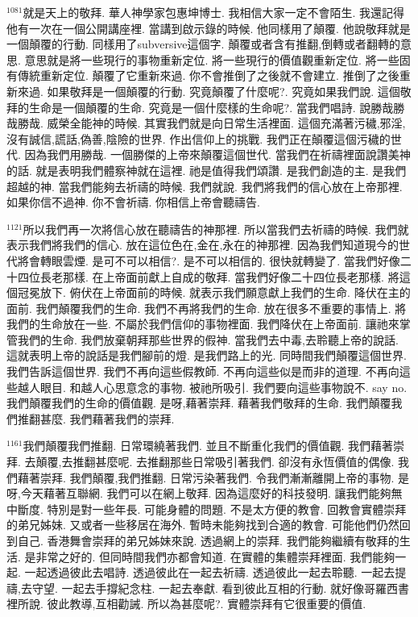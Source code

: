 \documentclass{book}
\begin{document}
$^{1081}$就是天上的敬拜.
華人神學家包惠坤博士.
我相信大家一定不會陌生.
我還記得他有一次在一個公開講座裡.
當講到啟示錄的時候.
他同樣用了顛覆.
他說敬拜就是一個顛覆的行動.
同樣用了subversive這個字.
顛覆或者含有推翻,倒轉或者翻轉的意思.
意思就是將一些現行的事物重新定位.
將一些現行的價值觀重新定位.
將一些固有傳統重新定位.
顛覆了它重新來過.
你不會推倒了之後就不會建立.
推倒了之後重新來過.
如果敬拜是一個顛覆的行動.
究竟顛覆了什麼呢?.
究竟如果我們說.
這個敬拜的生命是一個顛覆的生命.
究竟是一個什麼樣的生命呢?.
當我們唱詩.
說勝哉勝哉勝哉.
威榮全能神的時候.
其實我們就是向日常生活裡面.
這個充滿著污穢,邪淫,沒有誠信,謊話,偽善,陰險的世界.
作出信仰上的挑戰.
我們正在顛覆這個污穢的世代.
因為我們用勝哉.
一個勝傑的上帝來顛覆這個世代.
當我們在祈禱裡面說讚美神的話.
就是表明我們體察神就在這裡.
祂是值得我們頌讚.
是我們創造的主.
是我們超越的神.
當我們能夠去祈禱的時候.
我們就說.
我們將我們的信心放在上帝那裡.
如果你信不過神.
你不會祈禱.
你相信上帝會聽禱告.

$^{1121}$所以我們再一次將信心放在聽禱告的神那裡.
所以當我們去祈禱的時候.
我們就表示我們將我們的信心.
放在這位色在,金在,永在的神那裡.
因為我們知道現今的世代將會轉眼雲煙.
是可不可以相信?.
是不可以相信的.
很快就轉變了.
當我們好像二十四位長老那樣.
在上帝面前獻上自成的敬拜.
當我們好像二十四位長老那樣.
將這個冠冕放下.
俯伏在上帝面前的時候.
就表示我們願意獻上我們的生命.
降伏在主的面前.
我們顛覆我們的生命.
我們不再將我們的生命.
放在很多不重要的事情上.
將我們的生命放在一些.
不屬於我們信仰的事物裡面.
我們降伏在上帝面前.
讓祂來掌管我們的生命.
我們放棄朝拜那些世界的假神.
當我們去中毒,去聆聽上帝的說話.
這就表明上帝的說話是我們腳前的燈.
是我們路上的光.
同時間我們顛覆這個世界.
我們告訴這個世界.
我們不再向這些假教師.
不再向這些似是而非的道理.
不再向這些越人眼目.
和越人心思意念的事物.
被祂所吸引.
我們要向這些事物說不.
say no.
我們顛覆我們的生命的價值觀.
是呀,藉著崇拜.
藉著我們敬拜的生命.
我們顛覆我們推翻甚麼.
我們藉著我們的崇拜.

$^{1161}$我們顛覆我們推翻.
日常環繞著我們.
並且不斷重化我們的價值觀.
我們藉著崇拜.
去顛覆,去推翻甚麼呢.
去推翻那些日常吸引著我們.
卻沒有永恆價值的偶像.
我們藉著崇拜.
我們顛覆,我們推翻.
日常污染著我們.
令我們漸漸離開上帝的事物.
是呀,今天藉著互聯網.
我們可以在網上敬拜.
因為這麼好的科技發明.
讓我們能夠無中斷度.
特別是對一些年長.
可能身體的問題.
不是太方便的教會.
回教會實體崇拜的弟兄姊妹.
又或者一些移居在海外.
暫時未能夠找到合適的教會.
可能他們仍然回到自己.
香港舞會崇拜的弟兄姊妹來說.
透過網上的崇拜.
我們能夠繼續有敬拜的生活.
是非常之好的.
但同時間我們亦都會知道.
在實體的集體崇拜裡面.
我們能夠一起.
一起透過彼此去唱詩.
透過彼此在一起去祈禱.
透過彼此一起去聆聽.
一起去提禱,去守望.
一起去手撐紀念柱.
一起去奉獻.
看到彼此互相的行動.
就好像哥羅西書裡所說.
彼此教導,互相勸誡.
所以為甚麼呢?.
實體崇拜有它很重要的價值.
\end{document}
